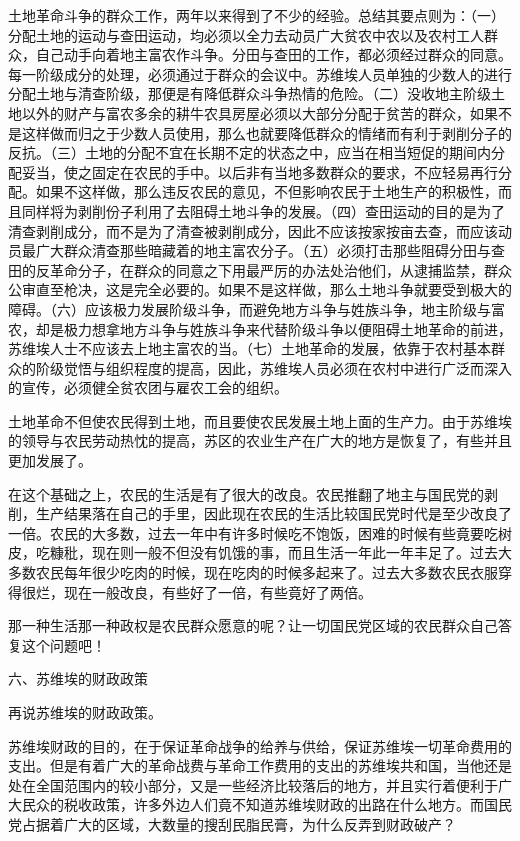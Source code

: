 土地革命斗争的群众工作，两年以来得到了不少的经验。总结其要点则为：（一）分配土地的运动与查田运动，均必须以全力去动员广大贫农中农以及农村工人群众，自己动手向着地主富农作斗争。分田与查田的工作，都必须经过群众的同意。每一阶级成分的处理，必须通过于群众的会议中。苏维埃人员单独的少数人的进行分配土地与清查阶级，那便是有降低群众斗争热情的危险。（二）没收地主阶级土地以外的财产与富农多余的耕牛农具房屋必须以大部分分配于贫苦的群众，如果不是这样做而归之于少数人员使用，那么也就要降低群众的情绪而有利于剥削分子的反抗。（三）土地的分配不宜在长期不定的状态之中，应当在相当短促的期间内分配妥当，使之固定在农民的手中。以后非有当地多数群众的要求，不应轻易再行分配。如果不这样做，那么违反农民的意见，不但影响农民于土地生产的积极性，而且同样将为剥削份子利用了去阻碍土地斗争的发展。（四）查田运动的目的是为了清查剥削成分，而不是为了清查被剥削成分，因此不应该按家按亩去查，而应该动员最广大群众清查那些暗藏着的地主富农分子。（五）必须打击那些阻碍分田与查田的反革命分子，在群众的同意之下用最严厉的办法处治他们，从逮捕监禁，群众公审直至枪决，这是完全必要的。如果不是这样做，那么土地斗争就要受到极大的障碍。（六）应该极力发展阶级斗争，而避免地方斗争与姓族斗争，地主阶级与富农，却是极力想拿地方斗争与姓族斗争来代替阶级斗争以便阻碍土地革命的前进，苏维埃人士不应该去上地主富农的当。（七）土地革命的发展，依靠于农村基本群众的阶级觉悟与组织程度的提高，因此，苏维埃人员必须在农村中进行广泛而深入的宣传，必须健全贫农团与雇农工会的组织。

土地革命不但使农民得到土地，而且要使农民发展土地上面的生产力。由于苏维埃的领导与农民劳动热忱的提高，苏区的农业生产在广大的地方是恢复了，有些并且更加发展了。

在这个基础之上，农民的生活是有了很大的改良。农民推翻了地主与国民党的剥削，生产结果落在自己的手里，因此现在农民的生活比较国民党时代是至少改良了一倍。农民的大多数，过去一年中有许多时候吃不饱饭，困难的时候有些竟要吃树皮，吃糠秕，现在则一般不但没有饥饿的事，而且生活一年此一年丰足了。过去大多数农民每年很少吃肉的时候，现在吃肉的时候多起来了。过去大多数农民衣服穿得很烂，现在一般改良，有些好了一倍，有些竟好了两倍。

那一种生活那一种政权是农民群众愿意的呢？让一切国民党区域的农民群众自己答复这个问题吧！

六、苏维埃的财政政策

再说苏维埃的财政政策。

苏维埃财政的目的，在于保证革命战争的给养与供给，保证苏维埃一切革命费用的支出。但是有着广大的革命战费与革命工作费用的支出的苏维埃共和国，当他还是处在全国范围内的较小部分，又是一些经济比较落后的地方，并且实行着便利于广大民众的税收政策，许多外边人们竟不知道苏维埃财政的出路在什么地方。而国民党占据着广大的区域，大数量的搜刮民脂民膏，为什么反弄到财政破产？

